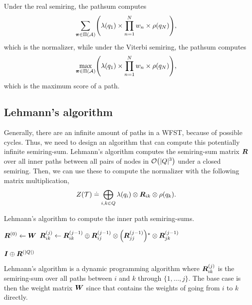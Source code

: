 Under the real semiring, the pathsum computes \[
  \sum_{\bm{\pi}\in\Pi(\mathcal{A})} \lft( \lambda(q_1) \times \prod_{n=1}^N w_n \times \rho(q_N) \rgt)
,\]
which is the normalizer, while under the Viterbi semiring, the pathsum computes
\[
  \max_{\bm{\pi}\in\Pi(\mathcal{A})} \lft( \lambda(q_1) \times \prod_{n=1}^N w_n \times \rho(q_N) \rgt)
,\]
which is the maximum score of a path.

\subsection{Lehmann's algorithm}

Generally, there are an infinite amount of paths in a WFST, because of possible
cycles. Thus, we need to design an algorithm that can compute this potentially
infinite semiring-sum. Lehmann's algorithm \citep{lehmann1977algebraic}
computes the semiring-sum matrix $\bm{R}$ over all inner paths between all
pairs of nodes in $\bigo{|Q|^3}$ under a closed semiring. Then, we can use
these to compute the normalizer with the following matrix multiplication, \[
  Z(\mathcal{T}) \doteq \bigoplus_{i,k \in Q} \lambda(q_i) \otimes \bm{R}_{ik} \otimes \rho(q_k)
.\]

\begin{algorithm}
  \caption{Lehmann's algorithm to compute the inner path semiring-sums.}
  \label{alg:lehmann}

  \begin{algorithmic}[1]
      \State $\bm{R}^{(0)} \gets \bm{W}$
            \State $\mat{R}_{ik}^{(j)} \gets \mat{R}_{ik}^{(j-1)} \oplus \mat{R}_{ij}^{(j-1)} \otimes \lft( \mat{R}_{jj}^{(j-1)} \rgt)^* \otimes \mat{R}_{jk}^{(j-1)}$
          \EndFor
        \EndFor
      \EndFor

      \State \Return $\bm{I} \oplus \bm{R}^{(|Q|)}$
    \EndFunction
  \end{algorithmic}
\end{algorithm}

Lehmann's algorithm is a dynamic programming algorithm where
$\bm{R}_{ik}^{(j)}$ is the semiring-sum over all paths between $i$ and $k$
through $\{ 1,\ldots, j \}$. The base case is then the weight matrix $\bm{W}$
since that contains the weights of going from $i$ to $k$ directly.

